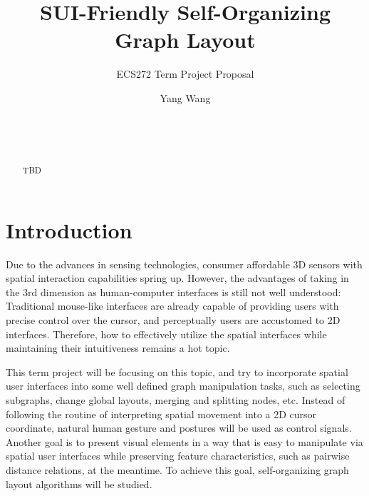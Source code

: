 \documentclass{acm_proc_article-sp}
\begin{document}
\title{SUI-Friendly Self-Organizing Graph Layout}
\subtitle{ECS272 Term Project Proposal}
\author{
\alignauthor
Yang Wang \\
        \\
        \\
        \\
}
\maketitle

\begin{abstract}
TBD
\end{abstract}


\section{Introduction}

Due to the advances in sensing technologies, consumer affordable 3D sensors with spatial interaction capabilities spring up. However, the advantages of taking in the 3rd dimension as human-computer interfaces is still not well understood: Traditional mouse-like interfaces are already capable of providing users with precise control over the cursor, and perceptually users are accustomed to 2D interfaces. Therefore, how to effectively utilize the spatial interfaces while maintaining their intuitiveness remains a hot topic.

This term project will be focusing on this topic, and try to incorporate spatial user interfaces into some well defined graph manipulation tasks, such as selecting subgraphs, change global layouts, merging and splitting nodes, etc. Instead of following the routine of interpreting spatial movement into a 2D cursor coordinate, natural human gesture and postures will be used as control signals. Another goal is to present visual elements in a way that is easy to manipulate via spatial user interfaces while preserving feature characteristics, such as pairwise distance relations, at the meantime. To achieve this goal, self-organizing graph layout algorithms will be studied. 
\end{document}

